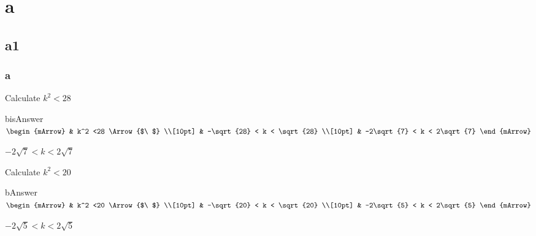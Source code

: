 \clearpage
\printshortsolutions
\clearpage

\section{a}
\subsection{a1}
\subsubsection{a}



\begin{mtask}
    \task Calculate $ k^2 < 28$
              \begin{envOut}[equal height group=A-Rev-1]{bisAnswer}
			       $\begin{mArrow}
			             & k^2 <28      \Arrow{$\ $} \\[10pt]
                         & -\sqrt{28} < k < \sqrt{28}	  \\[10pt] 
					     & -2\sqrt{7} < k < 2\sqrt{7}
	                \end{mArrow}$
              \end{envOut}			  
			  \begin{exercise}\begin{shortsolution}  
				       $-2\sqrt{7} < k < 2\sqrt{7}$
			  \end{shortsolution}\end{exercise}					

    \task Calculate $ k^2 < 20$
              \begin{envOut}[equal height group=A-Rev-1]{bAnswer}
			       $\begin{mArrow}
			             & k^2 <20      \Arrow{$\ $} \\[10pt]
                         & -\sqrt{20} < k < \sqrt{20}	  \\[10pt] 
					     & -2\sqrt{5} < k < 2\sqrt{5}
	                \end{mArrow}$
              \end{envOut}			  
			  \begin{exercise}\begin{shortsolution}  
				       $-2\sqrt{5} < k < 2\sqrt{5}$
			  \end{shortsolution}\end{exercise}						  


\end{mtask}
